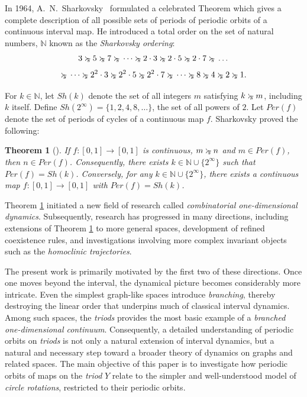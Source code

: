 \documentclass[12pt,reqno]{amsart}
\newtheorem{theorem}{Theorem}[section]
\theoremstyle{definition}
\theoremstyle{remark}
\theoremstyle{assumption}
\numberwithin{equation}{section}
\newcommand{\sha}{\succ\mkern-14mu_s\;}
\begin{document}
 In 1964,  A.~N.~Sharkovsky~\cite{shatr} formulated a celebrated Theorem which gives a complete description of all possible sets of periods of periodic orbits of a continuous interval map. He introduced a total order on the set of  natural numbers, $\mathbb{N}$ known as the \emph{Sharkovsky ordering}: 
$$3\sha 5\sha 7\sha\dots\sha 2\cdot3\sha 2\cdot5\sha 2\cdot7\sha\dots$$
$$\sha\dots\sha 2^2\cdot3\sha 2^2\cdot5\sha 2^2\cdot7\sha\dots\sha 8\sha 4\sha 2\sha 1.$$

For $k\in\mathbb{N}$, let $Sh(k)$ denote the set of all integers $m$ satisfying $k\sha m$, including $k$ itself.  
Define $Sh(2^\infty)=\{1,2,4,8,\dots\}$, the set of all powers of $2$.  
Let $Per(f)$ denote the set of periods of cycles of a continuous map $f$.  Sharkovsky proved the following:

\begin{theorem}[\cite{shatr}]\label{t:shar}
	If $f:[0,1]\to[0,1]$ is continuous, $m\sha n$ and $m\in Per(f)$, then $n\in Per(f)$.  
	Consequently, there exists $k\in \mathbb{N}\cup\{2^\infty\}$ such that $Per(f)=Sh(k)$.  
	Conversely, for any $k\in \mathbb{N}\cup\{2^\infty\}$, there exists a continuous map $f:[0,1]\to[0,1]$ with $Per(f)=Sh(k)$.
\end{theorem}

Theorem \ref{t:shar} initiated a new field of research called \emph{combinatorial one-dimensional dynamics}.  Subsequently, research has progressed in many directions, including extensions of Theorem \ref{t:shar} to more general spaces, development of refined coexistence rules, and investigations involving more complex invariant objects such as the \emph{homoclinic trajectories}.  



The present work is primarily motivated by the first two of these
directions. Once one moves beyond the interval, the dynamical picture
becomes considerably more intricate. Even the simplest graph-like
spaces introduce \emph{branching}, thereby destroying the linear order
that underpins much of classical interval dynamics. Among
such spaces, the \emph{triods} provides the most basic example of a
\emph{branched one-dimensional continuum}. Consequently, a detailed understanding of
periodic orbits on \emph{triods} is not only a natural extension of interval dynamics,  but a  natural and necessary step toward a broader theory of dynamics on graphs and related spaces. The
main objective of this paper is to investigate how periodic orbits of
maps on the \emph{triod} $Y$ relate to the simpler and well-understood model of
\emph{circle rotations}, restricted to their periodic orbits.
\end{document}
